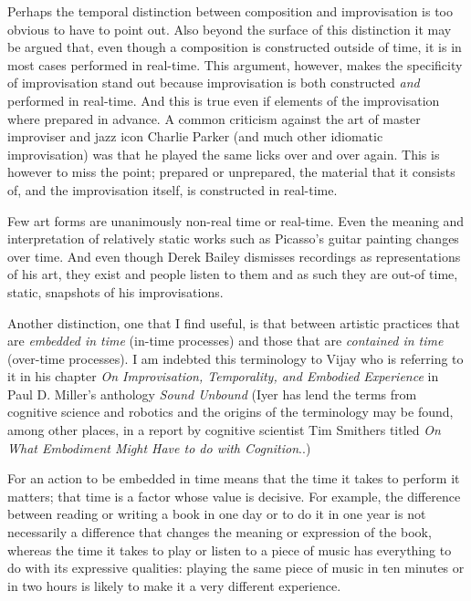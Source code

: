\documentclass{article}
\begin{document}
Perhaps the temporal distinction between composition and improvisation is too obvious to have to point out. Also beyond the surface of this distinction it may be argued that, even though a composition is constructed outside of time, it is in most cases performed in real-time. This argument, however, makes the specificity of improvisation stand out because improvisation is both constructed \emph{and} performed in real-time. And this is true even if elements of the improvisation where prepared in advance. A common criticism against the art of master improviser and jazz icon Charlie Parker (and much other idiomatic improvisation) was that he played the same licks over and over again. This is however to miss the point; prepared or unprepared, the material that it consists of, and the improvisation itself, is constructed in real-time.



Few art forms are unanimously non-real time or real-time. Even the meaning and interpretation of relatively static works such as Picasso's guitar painting changes over time. And even though Derek Bailey dismisses recordings as representations of his art, they exist and people listen to them and as such they are out-of time, static, snapshots of his improvisations.

Another distinction, one that I find useful, is that between artistic practices that are \emph{embedded in time} (in-time processes) and those that are \emph{contained in time} (over-time processes). I am indebted this terminology to Vijay \citet{iyer08} who is referring to it in his chapter \emph{On Improvisation, Temporality, and Embodied Experience} in Paul D. Miller's anthology \emph{Sound Unbound} (Iyer has lend the terms from cognitive science and robotics and the origins of the terminology may be found, among other places, in a report by cognitive scientist Tim Smithers titled \emph{On What Embodiment Might Have to do with Cognition}.\citep{smithers96,smithers:98,vangelder98}.)

For an action to be embedded in time means that the time it takes to perform it matters; that time is a factor whose value is decisive. For example, the difference between reading or writing a book in one day or to do it in one year is not necessarily a difference that changes the meaning or expression of the book, whereas the time it takes to play or listen to a piece of music has everything to do with its expressive qualities: playing the same piece of music in ten minutes or in two hours is likely to make it a very different experience. %
\end{document}
